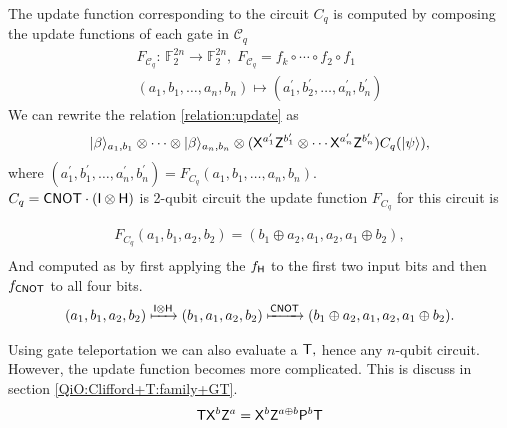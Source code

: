The update function corresponding to the circuit $C_q$ is computed by composing the update functions of each gate in $\mathcal{C}_q$
\begin{equation*}
\begin{aligned}
F_{\mathcal{C}_q}:\, \mathbb{F}_2^{2n} \rightarrow  \mathbb{F}_2^{2n}, \; F_{\mathcal{C}_q}=f_k\circ\cdots \circ f_2 \circ f_1 \\(a_1,b_1,\dots, a_n,b_n)\mapsto (a_1^\prime,b_2^\prime,\dots, a_n^\prime,b_n^\prime) 
 \end{aligned}
\end{equation*}
We can rewrite the relation \ref{relation:update} as
\begin{equation*}
\begin{aligned}
{\lvert}\beta\rangle_{a_1,b_1}\otimes \cdots \otimes {\lvert}\beta\rangle_{a_n,b_n} \otimes ({\sf X}^{a_1^\prime}{\sf Z}^{b_1^\prime}\otimes \cdots {\sf X}^{a_n^\prime}{\sf Z}^{b_n^\prime})C_q({\lvert}\psi\rangle),
 \end{aligned}
\end{equation*}
where $(a_1^\prime,b_1^\prime,\dots, a_n^\prime,b_n^\prime)=F_{C_q}(a_1,b_1,\ldots,a_n,b_n).$ \\

 $C_q={\sf CNOT} \cdot ({\sf I} \otimes {\sf H})$ is 2-qubit circuit the update function $F_{C_q}$ for this circuit is 

\begin{equation*}
\begin{aligned}
F_{C_q}(a_1,b_1,a_2,b_2)=(b_1\oplus a_2,a_1,a_2, a_1\oplus b_2),\\
\end{aligned}
\end{equation*}
And computed as by first applying the $f_{\sf H}$ to the first two input bits and then $f_{{\sf CNOT}}$ to all four bits.
\begin{equation*}
\begin{aligned}
(a_1,b_1,a_2,b_2) \xmapsto{{\sf I}\otimes {\sf H}} (b_1,a_1,a_2,b_2)\xmapsto{{\sf CNOT}} (b_1\oplus a_2,a_1,a_2, a_1\oplus b_2).
\end{aligned}
\end{equation*}

\begin{remark}
Using gate teleportation we can also evaluate a  ${\sf T},$  hence any $n$-qubit circuit. However, the update function becomes more complicated. This is discuss in section \ref{QiO:Clifford+T:family+GT}.
						$${\sf T} {\sf X}^b {\sf Z}^a= {\sf X}^b {\sf Z}^{a\oplus b} {\sf P}^b {\sf T}$$
\end{remark}





			
				




